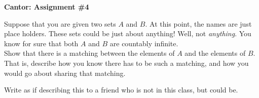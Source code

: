 \documentclass[12pt,letterpaper]{article}
\begin{document}
\setlength{\parskip}{1ex plus 0.5ex minus 0.2ex}
\setlength{\parindent}{0pt}

\pagestyle{fancy}
\lfoot{}
\rfoot{}

\begin{center}
{
\Large
\textbf{Cantor: Assignment \#4}
}
\end{center}

Suppose that you are given two sets $A$ and $B$.
At this point, the names are just place holders. 
These sets could be just about anything!
Well, not \emph{anything}.
You know for sure that both $A$ and $B$ are countably infinite.\\

Show that there is a matching between the elements of $A$ and the elements of $B$.
That is, describe how you know there has to be such a matching, and how you would go about sharing that matching.

Write as if describing this to a friend who is not in this class, but could be.
\end{document}

